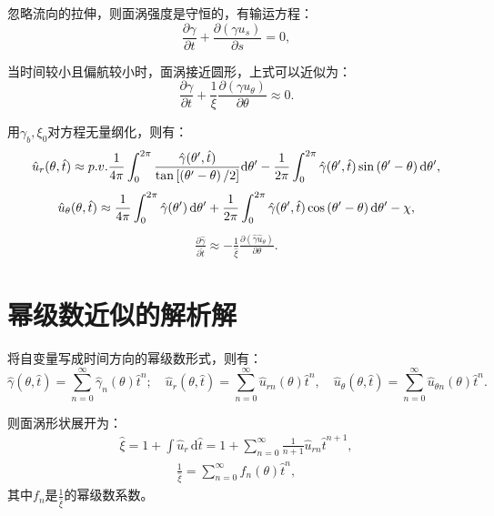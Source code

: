 \documentclass[UTF8,zihao=5]{ctexart} %
\begin{document}
忽略流向的拉伸，则面涡强度是守恒的，有输运方程：
\begin{equation} \frac{\partial \gamma}{\partial t}+ \frac{\partial\left(\gamma u_s\right)}{\partial s}=0, \end{equation}

当时间较小且偏航较小时，面涡接近圆形，上式可以近似为：
\begin{equation} \frac{\partial \gamma}{\partial t}+ \frac{1}{\xi}\frac{\partial (\gamma u_\theta)}{\partial \theta}\approx 0. \end{equation}

用$\gamma_b,\xi_0$对方程无量纲化，则有：
\begin{gather}\label{eq:evUR} \hat{u}_{r}(\theta,\hat{t})\approx {p.v.}\frac{1}{4{\rm \pi}} \int_{0}^{2{\rm \pi}} \frac{\hat{\gamma}(\theta',\hat{t})}{\tan{\left[\left(\theta'-\theta\right)/2\right]}}\textrm{d}\theta' -\frac{1}{2{\rm \pi}}\int_0^{2{\rm \pi}}\hat{\gamma}(\theta',\hat{t})\sin\left({\theta'-\theta}\right)\textrm{d}\theta', \end{gather}
\begin{gather}\label{eq:evUT}\hat{u}_{\theta}(\theta,\hat{t})\approx\frac{1}{4{\rm \pi}} \int_{0}^{2{\rm \pi}}\hat{\gamma}(\theta')\,\textrm{d}\theta'+\frac{1}{2{\rm \pi}} \int_0^{2{\rm \pi}}\hat{\gamma}(\theta',\hat{t})\cos\left({\theta'-\theta}\right)\textrm{d}\theta'-\chi, \end{gather}
\begin{gather}\label{eq:evGM}\frac{\partial \hat{\gamma}}{\partial \hat{t}} \approx{-}\frac{1}{\hat{\xi}} \frac{\partial (\hat{\gamma} \hat{u}_\theta)}{\partial \theta}. \end{gather}


\section{幂级数近似的解析解}

将自变量写成时间方向的幂级数形式，则有：
\begin{equation} \hat{\gamma}(\theta,\hat{t}) = \sum _{n=0}^{\infty} \hat{\gamma}_{n}(\theta)\hat{t}^{n}; \quad \hat{u}_r(\theta,\hat{t}) = \sum _{n=0}^{\infty} \hat{u}_{r n}(\theta)\hat{t}^{n}, \quad \hat{u}_{\theta}(\theta,\hat{t}) =\sum _{n=0}^{\infty} \hat{u}_{\theta n}(\theta)\hat{t}^{n}. \end{equation}

则面涡形状展开为：
\begin{gather} \hat{\xi}=1+\int \hat{u}_r\,\textrm{d}\hat{t}=1+\sum _{n=0}^{\infty} \frac{1}{n+1} \hat{u}_{r n} \hat{t}^{n+1}, \end{gather}
\begin{gather}\frac{1}{\hat{\xi}} = \sum _{n=0}^{\infty} f_{n}(\theta)\hat{t}^{n}, \end{gather}
其中$f_n$是$\frac{1}{\hat{\xi}}$的幂级数系数。
\end{document}
